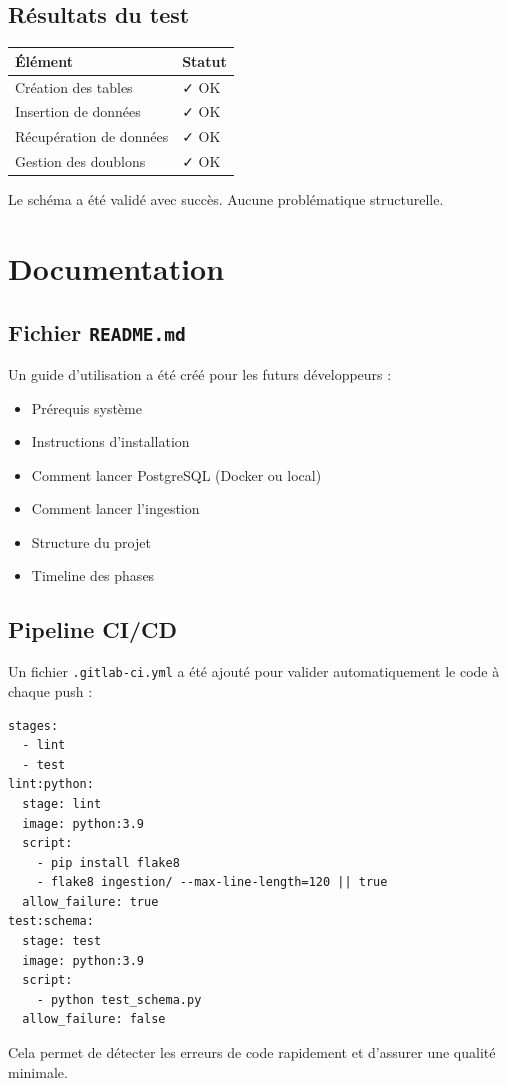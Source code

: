 \documentclass[12pt, a4paper]{article}
\begin{document}
\subsection{Résultats du test}
\begin{center}
\begin{tabular}{ll}
\toprule
\textbf{Élément} & \textbf{Statut} \\
\midrule
Création des tables & ✓ OK \\
Insertion de données & ✓ OK \\
Récupération de données & ✓ OK \\
Gestion des doublons & ✓ OK \\
\bottomrule
\end{tabular}
\end{center}
Le schéma a été validé avec succès. Aucune problématique structurelle.
\section{Documentation}
\subsection{Fichier \texttt{README.md}}
Un guide d'utilisation a été créé pour les futurs développeurs :
\begin{itemize}
    \item Prérequis système
    \item Instructions d'installation
    \item Comment lancer PostgreSQL (Docker ou local)
    \item Comment lancer l'ingestion
    \item Structure du projet
    \item Timeline des phases
\end{itemize}
\subsection{Pipeline CI/CD}
Un fichier \texttt{.gitlab-ci.yml} a été ajouté pour valider automatiquement le code à chaque push :
\begin{lstlisting}[style=yaml]
stages:
  - lint
  - test
lint:python:
  stage: lint
  image: python:3.9
  script:
    - pip install flake8
    - flake8 ingestion/ --max-line-length=120 || true
  allow_failure: true
test:schema:
  stage: test
  image: python:3.9
  script:
    - python test_schema.py
  allow_failure: false
\end{lstlisting}
Cela permet de détecter les erreurs de code rapidement et d'assurer une qualité minimale.
\end{document}
